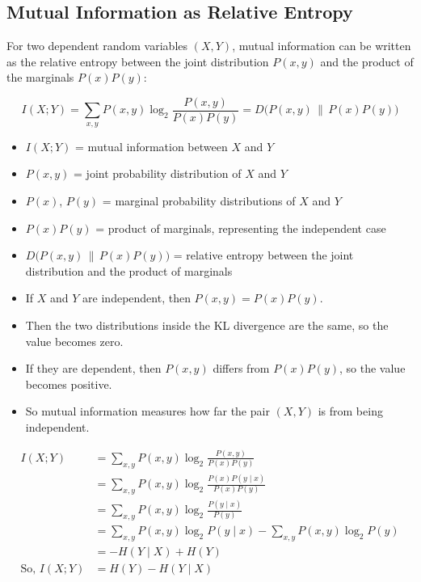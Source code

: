 \documentclass[11pt,a4paper]{book}
\newenvironment{formulabox}[1][Formula]{%
    \begin{tcolorbox}[
        enhanced,
        breakable,
        colback=softcoral!10,
        colframe=softcoral!200,
        title=#1,
        fonttitle=\bfseries,
        coltitle=white,
        sharp corners,
        boxrule=1pt,
        left=8pt,
        right=8pt,
        top=6pt,
        bottom=6pt
    ]
}{\end{tcolorbox}}
\newenvironment{infobox}[1][Information]{%
    \begin{tcolorbox}[
        enhanced,
        breakable,
        colback=mintgreen!10,
        colframe=mintgreen!200,
        title=#1,
        fonttitle=\bfseries,
        sharp corners,
        boxrule=0.8pt,
        left=8pt,
        right=8pt,
        top=6pt,
        bottom=6pt
    ]
}{\end{tcolorbox}}
\begin{document}
\clearpage

\subsection{Mutual Information as Relative Entropy}

\begin{formulabox}[Mutual Information from Relative Entropy]
For two dependent random variables $(X,Y)$, mutual information can be written as the relative entropy between the joint distribution $P(x,y)$ and the product of the marginals $P(x)P(y)$:

\[
I(X;Y) = \sum_{x,y} P(x,y)\log_2 \frac{P(x,y)}{P(x)P(y)}
= D\bigl(P(x,y)\,\|\,P(x)P(y)\bigr)
\]
\begin{itemize}
    \item $I(X;Y)$ = mutual information between $X$ and $Y$
    \item $P(x,y)$ = joint probability distribution of $X$ and $Y$
    \item $P(x)$, $P(y)$ = marginal probability distributions of $X$ and $Y$
    \item $P(x)P(y)$ = product of marginals, representing the independent case
    \item $D\bigl(P(x,y)\,\|\,P(x)P(y)\bigr)$ = relative entropy between the joint distribution and the product of marginals
\end{itemize}
\end{formulabox}

\begin{infobox}[Simple Meaning]
\begin{itemize}
    \item If $X$ and $Y$ are independent, then \(P(x,y)=P(x)P(y)\).
    \item Then the two distributions inside the KL divergence are the same, so the value becomes zero.
    \item If they are dependent, then \(P(x,y)\) differs from \(P(x)P(y)\), so the value becomes positive.
    \item So mutual information measures how far the pair $(X,Y)$ is from being independent.
\end{itemize}
\end{infobox}

\begin{align*}
I(X;Y)
&= \sum_{x,y} P(x,y)\log_2 \frac{P(x,y)}{P(x)P(y)}\\
&= \sum_{x,y} P(x,y)\log_2 \frac{P(x)P(y \mid x)}{P(x)P(y)} \\
&= \sum_{x,y} P(x,y)\log_2 \frac{P(y \mid x)}{P(y)} \\
&= \sum_{x,y} P(x,y)\log_2 P(y \mid x) - \sum_{x,y} P(x,y)\log_2 P(y) \\
&= -H(Y \mid X) + H(Y)\\
\text{So, } I(X;Y) &= H(Y) - H(Y \mid X)
\end{align*}
\end{document}
